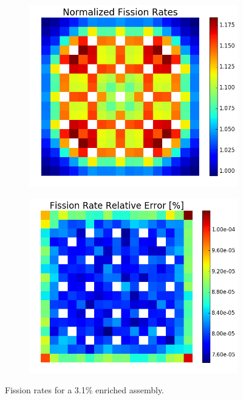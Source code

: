 \begin{figure}[h!]
\centering
\begin{subfigure}{0.5\textwidth}
  \centering
  \includegraphics[width=\linewidth]{figures/benchmarks/fission-rates/fiss-mean-fuel-31}
  \caption{}
  \label{fig:chap7-fiss-rate-mean-3.1-assm}
\end{subfigure}%
\begin{subfigure}{0.5\textwidth}
  \centering
  \includegraphics[width=\linewidth]{figures/benchmarks/fission-rates/fiss-rel-err-fuel-31}
  \caption{}
  \label{fig:chap7-fiss-rate-rel-err-3.1-assm}
\end{subfigure}%
\caption[Fission rates for a 3.1\% enriched assembly]{Fission rates for a 3.1\% enriched assembly.}
\label{fig:chap7-fiss-rates-3.1-assm}
\end{figure}

